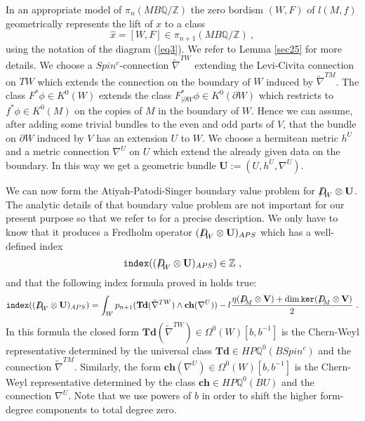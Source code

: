 \documentclass[12pt]{article}
\renewcommand{\ker}{{\tt ker}}
\newcommand{\Z}{{\mathbb{Z}}}
\newcommand{\Q}{{\mathbb{Q}}}
\newcommand{\Td}{{\mathbf{Td}}}
\newcommand{\ch}{{\mathbf{ch}}}
\newcommand{\bV}{{\mathbf{V}}}
\newcommand{\bU}{{\mathbf{U}}}
\newcommand{\Dirac}{{D\hspace{-0.27cm}/}}
\newcommand{\ind}{{\tt index}}
\begin{document}
In an appropriate model of $\pi_{n}(MB\Q/\Z)$ the zero bordism $(W,F)$  of $l(M,f)$   geometrically represents the lift of $x$ to  a class $$\hat x=[W,F]\in \pi_{n+1}(MB\Q/\Z)\ ,$$ using the notation of the diagram (\ref{eq3}).
We refer to Lemma  \ref{sec25} for more details.
We choose a  $Spin^{c}$-connection $\tilde \nabla^{TW}$ extending the 
 Levi-Civita connection  on $TW$   which extends the connection on the boundary of $W$  induced by $\tilde \nabla^{TM}$. 
The class $F^{*}\phi\in  K^{0}(W)$ extends the class $F_{|\partial W}^{*}\phi\in K^{0}(\partial W)$ which restricts to $f^{*}\phi\in K^{0}(M)$ on the copies of $M$ in the boundary of $W$. Hence  we can assume, after  adding some trivial bundles to the even and odd parts of $V$,  that the bundle on $\partial W$ induced by $V$  has an extension $U$ to $W$. We choose a hermitean metric $h^{U}$ and a metric connection $\nabla^{U}$ on $U$ which extend the  already given data on the boundary. In this way we get a geometric bundle $\bU:=(U,h^{U},\nabla^{U})$.

 We can now form the Atiyah-Patodi-Singer
boundary value problem for $\Dirac_{W}\otimes \bU$.
The analytic details of that boundary value problem are not important for our present purpose so that we refer to \cite{MR0397797} for a precise description. We only have to know that it produces a Fredholm operator $(\Dirac_{W}\otimes \bU)_{APS}$ which has a well-defined index
$$\ind((\Dirac_{W}\otimes \bU)_{APS})\in \Z\ ,$$ and that the following index formula
proved in \cite{MR0397797} holds true: 
\begin{equation}\label{eq4}\ind((\Dirac_{W}\otimes \bU)_{APS})=\int_{W} p_{n+1}(\Td(\tilde \nabla^{TW})\wedge \ch(\nabla^{U}))-l \frac{\eta(\Dirac_{M}\otimes \bV)+\dim\ker(\Dirac_{M}\otimes \bV)}{2}\ .\end{equation}
In this formula the  closed form $\Td(\tilde \nabla^{TW})\in \Omega^{0}(W)[b,b^{-1}]$ is the Chern-Weyl representative determined by the universal class $\Td\in HP\Q^{0}(BSpin^{c})$ and the connection $\tilde \nabla^{TM}$.
Similarly, the form $\ch(\nabla^U)\in \Omega^{0}(W)[b,b^{-1}]$ is the Chern-Weyl representative
determined by the class $\ch\in HP\Q^{0}(BU)$ and the connection $\nabla^{U}$. 
Note that we use powers of $b$ in order  to shift the higher form-degree components to total degree zero.
\end{document}

